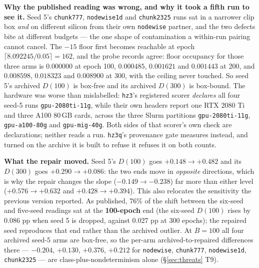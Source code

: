 \documentclass[10pt,letterpaper]{article}
\newcommand{\Dstat}{D}                         %
\newcommand{\arm}[1]{\texttt{#1}}
\begin{document}
\textbf{Why the published reading was wrong, and why it took a fifth run to see it.} Seed 5's
\arm{chunk777}, \arm{nodewise1d} and \arm{chunk2325} runs sat in a narrower clip box
\emph{and} on different silicon from their own \arm{nodewise} partner, and the two defects bite at
different budgets --- the one shape of contamination a within-run pairing cannot cancel. The
$-15$ floor first becomes reachable at epoch $\lceil 8.092245 / 0.05 \rceil = 162$, and the probe
records agree: floor occupancy for those three arms is $0.000000$ at epoch 100, $0.000485$,
$0.001621$ and $0.001443$ at 200, and $0.008598$, $0.018323$ and $0.008900$ at 300, with the
ceiling never touched. So seed 5's archived $\Dstat(100)$ is box-free and its archived
$\Dstat(300)$ is box-bound. The hardware was worse than mislabelled: \arm{hz3}'s registered scorer
\emph{declares} all four seed-5 runs \texttt{gpu-2080ti-11g}, while their own headers report one
RTX 2080 Ti and three A100 80\,GB cards, across the three Slurm partitions
\texttt{gpu-2080ti-11g}, \texttt{gpu-a100-80g} and \texttt{gpu-mig-40g}. Both sides of that
scorer's own check are declarations; neither reads a run. \arm{hz3q}'s provenance gate measures
instead, and turned on the archive it is built to refuse it refuses it on both counts.

\textbf{What the repair moved.} Seed 5's $\Dstat(100)$ goes $+0.148 \to +0.482$ and its
$\Dstat(300)$ goes $+0.290 \to +0.086$: the two ends move in \emph{opposite} directions, which is
why the repair changes the slope ($-0.149 \to -0.238$) far more than either level ($+0.576 \to
+0.632$ and $+0.428 \to +0.394$). This also relocates the sensitivity the previous version
reported. As published, 76\% of the shift between the six-seed and five-seed readings sat at the
\textbf{100-epoch} end (the six-seed $\Dstat(100)$ rises by 0.086 pp when seed 5 is dropped,
against 0.027 pp at 300 epochs); the repaired seed reproduces that end rather than the archived
outlier. At $B = 100$ all four archived seed-5 arms are box-free, so the per-arm
archived-to-repaired differences there --- $-0.204$, $+0.130$, $+0.376$, $+0.212$ for
\arm{nodewise}, \arm{chunk777}, \arm{nodewise1d}, \arm{chunk2325} --- are class-plus-nondeterminism
alone (\S\ref{sec:threats} T9).
\end{document}
